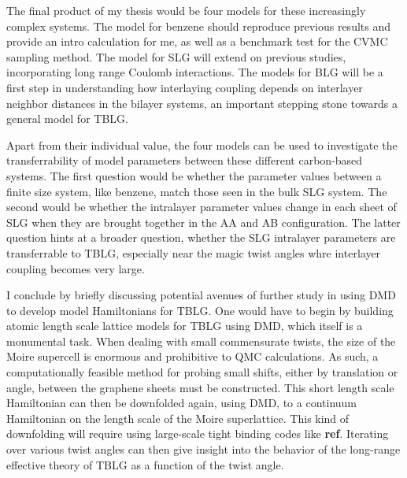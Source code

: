 \documentclass[12pt]{article}
\begin{document}
The final product of my thesis would be four models for these increasingly complex systems.
The model for benzene should reproduce previous results and provide an intro calculation for me, as well as a benchmark test for the CVMC sampling method.
The model for SLG will extend on previous studies, incorporating long range Coulomb interactions.
The models for BLG will be a first step in understanding how interlaying coupling depends on interlayer neighbor distances in the bilayer systems, an important stepping stone towards a general model for TBLG.

Apart from their individual value, the four models can be used to investigate the transferrability of model parameters between these different carbon-based systems.
The first question would be whether the parameter values between a finite size system, like benzene, match those seen in the bulk SLG system.
The second would be whether the intralayer parameter values change in each sheet of SLG when they are brought together in the AA and AB configuration.
The latter question hints at a broader question, whether the SLG intralayer parameters are transferrable to TBLG, especially near the magic twist angles whre interlayer coupling becomes very large.

I conclude by briefly discussing potential avenues of further study in using DMD to develop model Hamiltonians for TBLG. 
One would have to begin by building atomic length scale lattice models for TBLG using DMD, which itself is a monumental task.
When dealing with small commensurate twists, the size of the Moire supercell is enormous and prohibitive to QMC calculations.
As such, a computationally feasible method for probing small shifts, either by translation or angle, between the graphene sheets must be constructed.
This short length scale Hamiltonian can then be downfolded again, using DMD, to a continuum Hamiltonian on the length scale of the Moire superlattice.
This kind of downfolding will require using large-scale tight binding codes like \textbf{ref}.
Iterating over various twist angles can then give insight into the behavior of the long-range effective theory of TBLG as a function of the twist angle.
\end{document}

